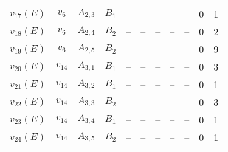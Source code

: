\begin{footnotesize}
\begin{center}
\begin{supertabular}{|lcccccccccc}
 $v_{17} (E)$ & $v_{6}$ & $A_{2,3}$ & $B_{1}$&  -- &  -- &  -- &  -- &  -- &0 & 1  \tabularnewline
 $v_{18} (E)$ & $v_{6}$ & $A_{2,4}$ & $B_{2}$&  -- &  -- &  -- &  -- &  -- &0 & 2  \tabularnewline
 $v_{19} (E)$ & $v_{6}$ & $A_{2,5}$ & $B_{2}$&  -- &  -- &  -- &  -- &  -- &0 & 9  \tabularnewline
 $v_{20} (E)$ & $v_{14}$ & $A_{3,1}$ & $B_{1}$&  -- &  -- &  -- &  -- &  -- &0 & 3  \tabularnewline
 $v_{21} (E)$ & $v_{14}$ & $A_{3,2}$ & $B_{1}$&  -- &  -- &  -- &  -- &  -- &0 & 1  \tabularnewline
 $v_{22} (E)$ & $v_{14}$ & $A_{3,3}$ & $B_{2}$&  -- &  -- &  -- &  -- &  -- &0 & 3  \tabularnewline
 $v_{23} (E)$ & $v_{14}$ & $A_{3,4}$ & $B_{1}$&  -- &  -- &  -- &  -- &  -- &0 & 1  \tabularnewline
 $v_{24} (E)$ & $v_{14}$ & $A_{3,5}$ & $B_{2}$&  -- &  -- &  -- &  -- &  -- &0 & 1  \tabularnewline
\bottomrule
\end{supertabular}
\end{center}
\end{footnotesize}
